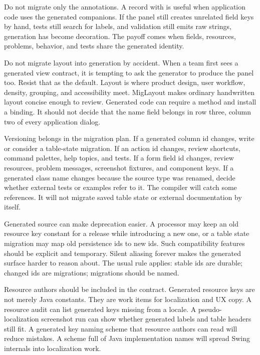Do not migrate only the annotations. A record with  is useful
when application code uses the generated companions. If the panel still
creates unrelated field keys by hand, tests still search for labels, and
validation still emits raw strings, generation has become decoration. The
payoff comes when fields, resources, problems, behavior, and tests share the
generated identity.

Do not migrate layout into generation by accident. When a team first sees a
generated view contract, it is tempting to ask the generator to produce the
panel too. Resist that as the default. Layout is where product design, user
workflow, density, grouping, and accessibility meet. MigLayout makes ordinary
handwritten layout concise enough to review. Generated code can require a
 method and install a binding. It should not decide that the
name field belongs in row three, column two of every application dialog.

Versioning belongs in the migration plan. If a generated column id changes,
write or consider a table-state migration. If an action id changes, review
shortcuts, command palettes, help topics, and tests. If a form field id
changes, review resources, problem messages, screenshot fixtures, and
component keys. If a generated class name changes because the source type was
renamed, decide whether external tests or examples refer to it. The compiler
will catch some references. It will not migrate saved table state or external
documentation by itself.

Generated source can make deprecation easier. A processor may keep an old
resource key constant for a release while introducing a new one, or a table
state migration may map old persistence ids to new ids. Such compatibility
features should be explicit and temporary. Silent aliasing forever makes the
generated surface harder to reason about. The usual rule applies: stable ids
are durable; changed ids are migrations; migrations should be named.

Resource authors should be included in the contract. Generated resource keys
are not merely Java constants. They are work items for localization and UX
copy. A resource audit can list generated keys missing from a locale. A
pseudo-localization screenshot run can show whether generated labels and table
headers still fit. A generated key naming scheme that resource authors can
read will reduce mistakes. A scheme full of Java implementation names will
spread Swing internals into localization work.

